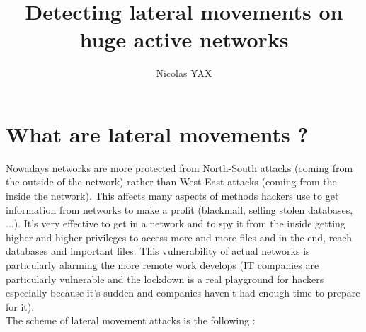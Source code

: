 \documentclass[11pt]{article}
\title{\textbf{Detecting lateral movements on huge active networks}}
\author{Nicolas YAX}
\date{}
\begin{document}
\maketitle


\section{What are lateral movements ?}

Nowadays networks are more protected from North-South attacks (coming from the outside of the network) rather than West-East attacks (coming from the inside the network). This affects many aspects of methods hackers use to get information from networks to make a profit (blackmail, selling stolen databases, ...). It's very effective to get in a network and to spy it from the inside getting higher and higher privileges to access more and more files and in the end, reach databases and important files. This vulnerability of actual networks is particularly alarming the more remote work develops (IT companies are particularly vulnerable and the lockdown is a real playground for hackers especially because it's sudden and companies haven't had enough time to prepare for it). \\
The scheme of lateral movement attacks is the following : 
\end{document}
